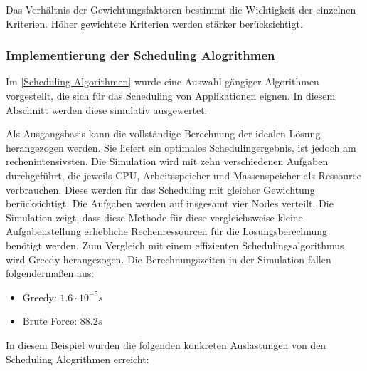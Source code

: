 Das Verhältnis der Gewichtungsfaktoren bestimmt die Wichtigkeit der einzelnen Kriterien. Höher gewichtete Kriterien werden stärker berücksichtigt.

\subsubsection{Implementierung der Scheduling Alogrithmen}

Im \autoref{Scheduling Algorithmen} wurde eine Auswahl gängiger Algorithmen vorgestellt, die sich für das Scheduling von Applikationen eignen. In diesem Abschnitt werden diese simulativ ausgewertet.

Als Ausgangsbasis kann die vollständige Berechnung der idealen Lösung herangezogen werden. Sie liefert ein optimales Schedulingergebnis, ist jedoch am rechenintensivsten. Die Simulation wird mit zehn verschiedenen Aufgaben durchgeführt, die jeweils CPU, Arbeitsspeicher und Massenspeicher als Ressource verbrauchen. Diese werden für das Scheduling mit gleicher Gewichtung berücksichtigt. Die Aufgaben werden auf insgesamt vier Nodes verteilt. Die Simulation zeigt, dass diese Methode für diese vergleichsweise kleine Aufgabenstellung erhebliche Rechenressourcen für die Lösungsberechnung benötigt werden. Zum Vergleich mit einem effizienten Schedulingsalgorithmus wird Greedy herangezogen. Die Berechnungszeiten in der Simulation fallen folgendermaßen aus:

\begin{itemize}
	\item Greedy: $1.6 \cdot 10^{-5} s$
	\item Brute Force: $88.2 s$
\end{itemize}

In diesem Beispiel wurden die folgenden konkreten Auslastungen von den Scheduling Alogrithmen erreicht:

